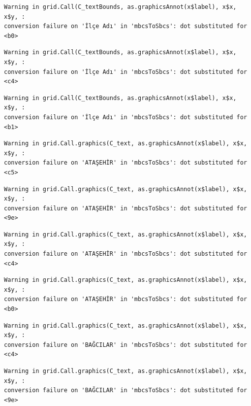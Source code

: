 \documentclass[
  11pt,
  a4paper,
  DIV=11,
  numbers=noendperiod]{scrartcl}
\begin{document}
\begin{verbatim}
Warning in grid.Call(C_textBounds, as.graphicsAnnot(x$label), x$x, x$y, :
conversion failure on 'İlçe Adı' in 'mbcsToSbcs': dot substituted for <b0>
\end{verbatim}

\begin{verbatim}
Warning in grid.Call(C_textBounds, as.graphicsAnnot(x$label), x$x, x$y, :
conversion failure on 'İlçe Adı' in 'mbcsToSbcs': dot substituted for <c4>
\end{verbatim}

\begin{verbatim}
Warning in grid.Call(C_textBounds, as.graphicsAnnot(x$label), x$x, x$y, :
conversion failure on 'İlçe Adı' in 'mbcsToSbcs': dot substituted for <b1>
\end{verbatim}

\begin{verbatim}
Warning in grid.Call.graphics(C_text, as.graphicsAnnot(x$label), x$x, x$y, :
conversion failure on 'ATAŞEHİR' in 'mbcsToSbcs': dot substituted for <c5>
\end{verbatim}

\begin{verbatim}
Warning in grid.Call.graphics(C_text, as.graphicsAnnot(x$label), x$x, x$y, :
conversion failure on 'ATAŞEHİR' in 'mbcsToSbcs': dot substituted for <9e>
\end{verbatim}

\begin{verbatim}
Warning in grid.Call.graphics(C_text, as.graphicsAnnot(x$label), x$x, x$y, :
conversion failure on 'ATAŞEHİR' in 'mbcsToSbcs': dot substituted for <c4>
\end{verbatim}

\begin{verbatim}
Warning in grid.Call.graphics(C_text, as.graphicsAnnot(x$label), x$x, x$y, :
conversion failure on 'ATAŞEHİR' in 'mbcsToSbcs': dot substituted for <b0>
\end{verbatim}

\begin{verbatim}
Warning in grid.Call.graphics(C_text, as.graphicsAnnot(x$label), x$x, x$y, :
conversion failure on 'BAĞCILAR' in 'mbcsToSbcs': dot substituted for <c4>
\end{verbatim}

\begin{verbatim}
Warning in grid.Call.graphics(C_text, as.graphicsAnnot(x$label), x$x, x$y, :
conversion failure on 'BAĞCILAR' in 'mbcsToSbcs': dot substituted for <9e>
\end{verbatim}
\end{document}
